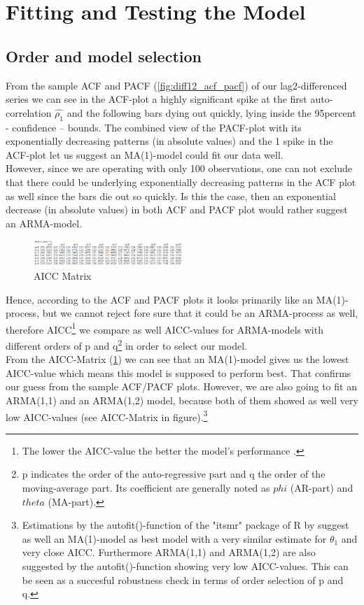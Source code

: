 \documentclass[11pt,a4paper]{article}
\begin{document}

\section{Fitting and Testing the Model}
\label{sec:FitTestModel}

\subsection{Order and model selection}

From the sample ACF and PACF (\cref{fig:diff12_acf_pacf}) of our lag2-differenced series we can see in the ACF-plot a highly significant spike at the first auto-correlation $\hat{\rho_1}$ and the following bars dying out quickly, lying inside the 95percent - confidence – bounds.
The combined view of the PACF-plot with its exponentially decreasing patterns (in absolute values) and the 1 spike in the ACF-plot let us suggest an MA(1)-model could fit our data well.\\
However, since we are operating with only 100 observations, one can not exclude that there could be underlying exponentially decreasing patterns in the ACF plot as well since the bars die out so quickly.
Is this the case, then an exponential decrease (in absolute values) in both ACF and PACF plot would rather suggest an ARMA-model.

\begin{figure}
    \centering
    \includegraphics[width=0.5\textwidth]{aicc_matrix}
    \caption{AICC Matrix}
    \label{fig:aicc_matrix}
\end{figure}

Hence, according to the ACF and PACF plots it looks primarily like an MA(1)-process, but we cannot reject fore sure that it could be an ARMA-process as well, therefore AICC\footnote{
    The lower the AICC-value the better the model's performance \citep{aic86}.
} we compare as well AICC-values for ARMA-models with different orders of p and q\footnote{
    p indicates the order of the auto-regressive part and q the order of the moving-average part.
    Its coefficient are generally noted as $phi$ (AR-part) and $theta$ (MA-part).} in order to select our model.\\
From the AICC-Matrix (\cref{fig:aicc_matrix}) we can see that an MA(1)-model gives us the lowest AICC-value which means this model is supposed to perform best. That confirms our guess from the sample ACF/PACF plots.
However, we are also going to fit an ARMA(1,1) and an ARMA(1,2) model, because both of them showed as well very low AICC-values (see AICC-Matrix in figure).\footnote{
    Estimations by the autofit()-function of the "itsmr" package of R by \cite{R_itsmr} suggest as well an MA(1)-model as best model with a very similar estimate for $\theta_1$ and very close AICC.
    Furthermore ARMA(1,1) and ARMA(1,2) are also suggested by the autofit()-function showing very low AICC-values.
    This can be seen as a succesful robustness check in terms of order selection of p and q.
}
\end{document}
